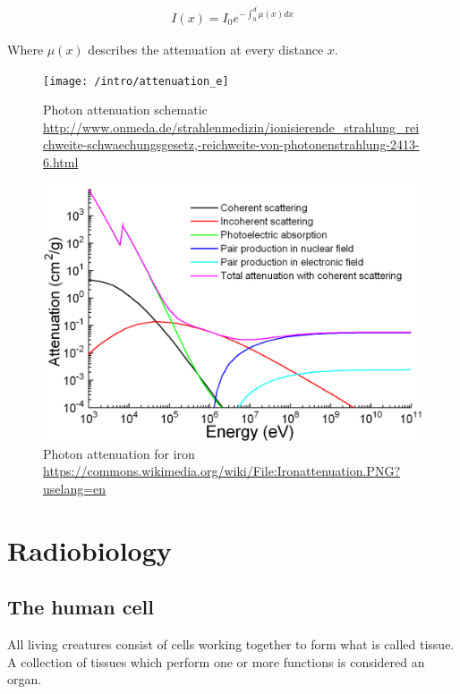 \begin{align}
\label{eq:mu_int}
I(x) = I_0 e^{- \int_{0}^{d} \mu(x)dx}
\end{align}

Where $\mu(x)$ describes the attenuation at every distance $x$.

\begin{figure}[h!]
	\centering
	\texttt{[image: /intro/attenuation\_e]}
	\caption{Photon attenuation schematic \\		\url{http://www.onmeda.de/strahlenmedizin/ionisierende_strahlung_reichweite-schwaechungsgesetz,-reichweite-von-photonenstrahlung-2413-6.html}}
	\label{fig:attenuation_water}
\end{figure}


\begin{figure}[h!]
	\centering
	\includegraphics[width=0.7\linewidth]{../fig/intro/Ironattenuation}
	\caption{Photon attenuation for iron \\ \url{https://commons.wikimedia.org/wiki/File:Ironattenuation.PNG?uselang=en}}
	\label{fig:attenuation_iron}
\end{figure}


\section{Radiobiology}
\label{sec:cell}
\subsection{The human cell}
All living creatures consist of cells working together to form what is called tissue.
A collection of tissues which perform one or more functions is considered an organ. \\

